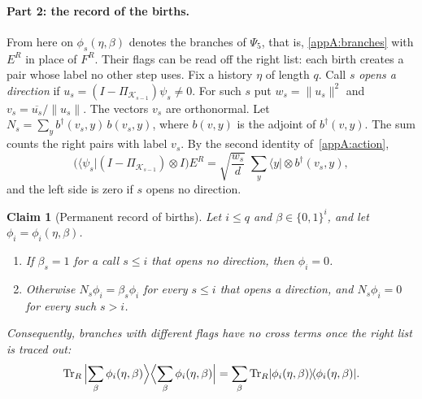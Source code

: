 \documentclass[11pt,letterpaper]{article}
\newtheorem{claim}[theorem]{Claim}
\theoremstyle{definition}\newtheorem{definition}[theorem]{Definition}
\newcommand{\Tr}{\operatorname{Tr}}
\newcommand{\ket}[1]{\lvert#1\rangle}
\newcommand{\bra}[1]{\langle#1\rvert}
\newcommand{\proj}[1]{\ket{#1}\!\bra{#1}}
\newcommand{\norm}[1]{\lVert#1\rVert}
\begin{document}
\paragraph{Part 2: the record of the births.}
From here on $\phi_s(\eta,\beta)$ denotes the branches of $\Psi_5$,
that is, \eqref{appA:branches} with $E^R$ in place of $F^R$. Their
flags can be read off the right list: each birth creates a pair whose
label no other step uses. Fix a history $\eta$ of length $q$. Call $s$
\emph{opens a direction}
if $u_s=(I-\Pi_{\mathcal K_{s-1}})\psi_s\ne0$. For such $s$ put
$w_s=\norm{u_s}^2$ and $v_s=\overline{u_s}/\norm{u_s}$. The vectors
$v_s$ are orthonormal. Let
$N_s=\sum_yb^\dagger(v_s,y)\,b(v_s,y)$, where $b(v,y)$ is the adjoint
of $b^\dagger(v,y)$. The sum counts the right pairs with label
$v_s$. By the second identity of~\eqref{appA:action},
\begin{equation}\label{appA:birth-amplitude}
 \bigl(\bra{\psi_s}(I-\Pi_{\mathcal K_{s-1}})\otimes I\bigr)E^R
 =\sqrt{\frac{w_s}{d}}\;\sum_y\bra y\otimes b^\dagger(v_s,y),
\end{equation}
and the left side is zero if $s$ opens no direction.

\begin{claim}[Permanent record of births]\label{appA:record}
Let $i\le q$ and $\beta\in\{0,1\}^i$, and let
$\phi_i=\phi_i(\eta,\beta)$.
\begin{enumerate}\renewcommand{\labelenumi}{(\roman{enumi})}\setlength\itemsep{0pt}
\item If $\beta_s=1$ for a call $s\le i$ that opens no direction, then
$\phi_i=0$.
\item Otherwise $N_s\phi_i=\beta_s\phi_i$ for every $s\le i$ that
opens a direction, and $N_s\phi_i=0$ for every such $s>i$.
\end{enumerate}
Consequently, branches with different flags have no cross terms once
the right list is traced out:
\begin{equation}\label{appA:no-cross}
 \Tr_R\,\Bigl|\sum_\beta\phi_i(\eta,\beta)\Bigr\rangle
 \Bigl\langle\sum_\beta\phi_i(\eta,\beta)\Bigr|
 =\sum_\beta\Tr_R\proj{\phi_i(\eta,\beta)} .
\end{equation}
\end{claim}
\end{document}
